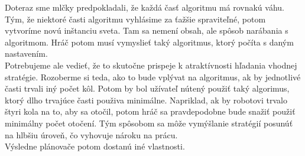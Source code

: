 Doteraz sme mlčky predpokladali, že každá časť algoritmu má rovnakú váhu. Tým, že niektoré časti algoritmu vyhlásime za ťažšie spraviteľné, potom vytvoríme novú inštanciu sveta. Tam sa nemení obsah, ale spôsob narábania s algoritmom. Hráč potom musí vymyslieť taký algoritmus, ktorý počíta s daným nastavením. \\
Potrebujeme ale vedieť, že to skutočne prispeje k atraktívnosti hľadania vhodnej stratégie. Rozoberme si teda, ako to bude vplývat na algoritmus, ak by jednotlivé časti trvali iný počet kôl. Potom by bol užívateľ nútený použiť taký algorimus, ktorý dlho trvajúce časti použiva minimálne. Napriklad, ak by robotovi trvalo štyri kola na to, aby sa otočil, potom hráč sa pravdepodobne bude snažiť použiť minimálny počet otočení.
Tým spôsobom sa môže vymýšlanie stratégií posunúť na hlbšiu úroveň, čo vyhovuje nároku na prácu.\\%
Výsledne plánovače potom dostanú iné vlastnosti. %
